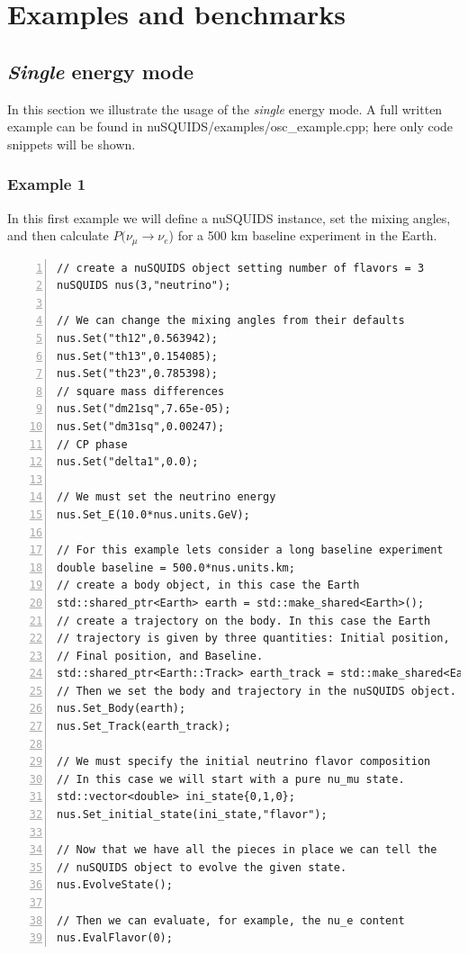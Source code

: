 \documentclass[3p,12pt,authoryear]{elsarticle}
\newcommand{\ttf}{\ttfamily}
\begin{document}
\section{Examples and benchmarks} 
\label{sec:examples} 

\subsection{{\it Single} energy mode}

In this section we illustrate the usage of the {\it single} energy mode. A full written example can be found in {\ttf nuSQUIDS/examples/osc\_example.cpp}; here only code snippets will be shown.

\subsubsection{Example 1}

In this first example we will define a {\ttf nuSQUIDS} instance, set the mixing angles, and then calculate $P(\nu_\mu \to \nu_e$) for a 500 km baseline experiment in the Earth.

\begin{lstlisting}[frame=leftline, numbers = left,breaklines=true]
// create a nuSQUIDS object setting number of flavors = 3
nuSQUIDS nus(3,"neutrino");

// We can change the mixing angles from their defaults
nus.Set("th12",0.563942);
nus.Set("th13",0.154085);
nus.Set("th23",0.785398);
// square mass differences
nus.Set("dm21sq",7.65e-05);
nus.Set("dm31sq",0.00247);
// CP phase
nus.Set("delta1",0.0);

// We must set the neutrino energy
nus.Set_E(10.0*nus.units.GeV);

// For this example lets consider a long baseline experiment
double baseline = 500.0*nus.units.km;
// create a body object, in this case the Earth
std::shared_ptr<Earth> earth = std::make_shared<Earth>();
// create a trajectory on the body. In this case the Earth
// trajectory is given by three quantities: Initial position,
// Final position, and Baseline.
std::shared_ptr<Earth::Track> earth_track = std::make_shared<Earth::Track>(0.0,baseline,baseline);
// Then we set the body and trajectory in the nuSQUIDS object.
nus.Set_Body(earth);
nus.Set_Track(earth_track);

// We must specify the initial neutrino flavor composition
// In this case we will start with a pure nu_mu state.
std::vector<double> ini_state{0,1,0};
nus.Set_initial_state(ini_state,"flavor");

// Now that we have all the pieces in place we can tell the
// nuSQUIDS object to evolve the given state.
nus.EvolveState();

// Then we can evaluate, for example, the nu_e content
nus.EvalFlavor(0);

\end{lstlisting}
\end{document}
